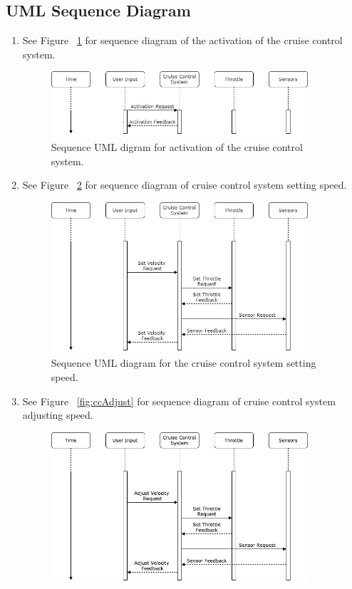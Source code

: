 \documentclass[preprint,11pt,3p]{article}
\begin{document}
\subsection{UML Sequence Diagram}
\begin{enumerate}
	\item See Figure ~\ref{fig:ccActivation} for sequence diagram of the activation of the cruise control system.
		\begin{figure}[H]
			\includegraphics[width=0.9\textwidth]{images/activation.png}
			\caption{Sequence UML digram for activation of the cruise control system.}
			\label{fig:ccActivation}
		\end{figure}
	\item See Figure ~\ref{fig:ccSet} for sequence diagram of cruise control system setting speed.
		\begin{figure}[H]
			\includegraphics[width=0.9\textwidth]{images/set.png}
			\caption{Sequence UML diagram for the cruise control system setting speed.}
			\label{fig:ccSet}
		\end{figure}
		\newpage
	\item See Figure ~\ref{fig:ccAdjust} for sequence diagram of cruise control system adjusting speed.
		\begin{figure}[H]
			\includegraphics[width=0.9\textwidth]{images/adjustSequence.png}

\end{figure}
\end{enumerate}
\end{document}
